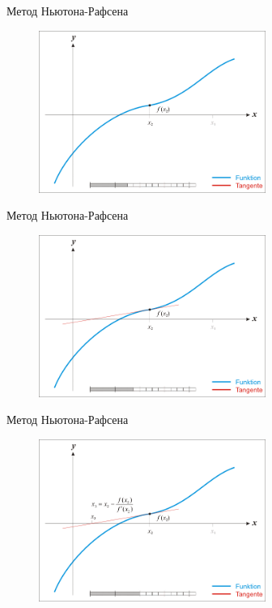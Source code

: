 \documentclass[10pt]{beamer}
\begin{document}
\begin{frame}{Метод Ньютона-Рафсена}
	\begin{figure}[htbp]
	  \includegraphics[height=150pt, keepaspectratio = true]{images/newton-6}   
	\end{figure}
\end{frame}

\begin{frame}{Метод Ньютона-Рафсена}
	\begin{figure}[htbp]
	  \includegraphics[height=150pt, keepaspectratio = true]{images/newton-7}   
	\end{figure}
\end{frame}

\begin{frame}{Метод Ньютона-Рафсена}
	\begin{figure}[htbp]
	  \includegraphics[height=150pt, keepaspectratio = true]{images/newton-8}   
	\end{figure}
\end{frame}
\end{document}
